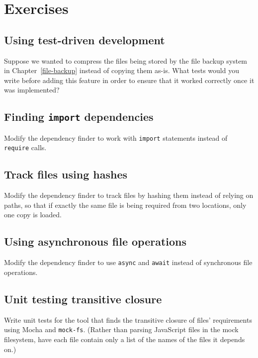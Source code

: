 \documentclass[krantzl]{krantz}
\newcommand{\chapref}[1]{Chapter~\ref{#1}}
\begin{document}
\section{Exercises}\label{module-bundler-exercises}

\subsection*{Using test-driven development}


Suppose we wanted to compress the files being stored by the file backup system in \chapref{file-backup}
instead of copying them as-is.
What tests would you write before adding this feature in order to ensure that it worked correctly
once it was implemented?

\subsection*{Finding \texttt{import} dependencies}


Modify the dependency finder to work with \texttt{import} statements instead of \texttt{require} calls.

\subsection*{Track files using hashes}


Modify the dependency finder to track files by hashing them instead of relying on paths,
so that if exactly the same file is being required from two locations,
only one copy is loaded.

\subsection*{Using asynchronous file operations}


Modify the dependency finder to use \texttt{async} and \texttt{await} instead of synchronous file operations.

\subsection*{Unit testing transitive closure}


Write unit tests for the tool that finds the transitive closure of files' requirements
using Mocha and \texttt{mock-fs}.
(Rather than parsing JavaScript files in the mock filesystem,
have each file contain only a list of the names of the files it depends on.)
\end{document}
